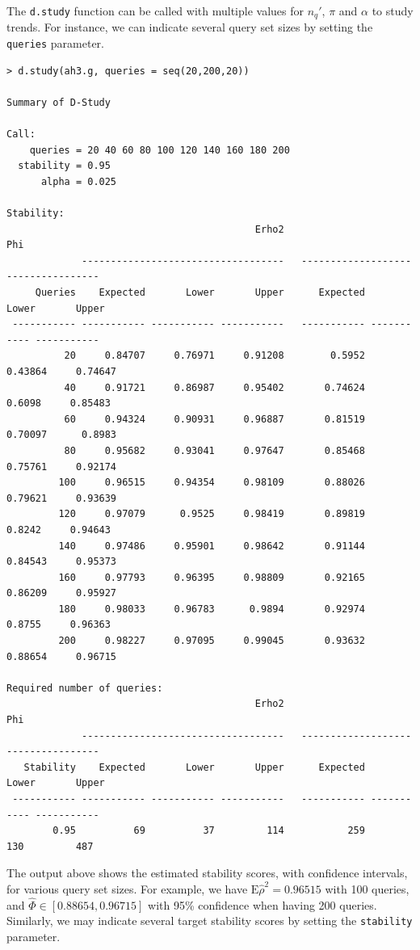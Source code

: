 \documentclass[twoside]{article}
\begin{document}
The \texttt{d.study} function can be called with multiple values for $n_q'$, $\pi$ and $\alpha$ to study trends. For instance, we can indicate several query set sizes by setting the \texttt{queries} parameter.

{\small\begin{verbatim}
> d.study(ah3.g, queries = seq(20,200,20))

Summary of D-Study

Call:
    queries = 20 40 60 80 100 120 140 160 180 200 
  stability = 0.95 
      alpha = 0.025 

Stability:
                                           Erho2                                   Phi
             -----------------------------------   -----------------------------------
     Queries    Expected       Lower       Upper      Expected       Lower       Upper
 ----------- ----------- ----------- -----------   ----------- ----------- -----------
          20     0.84707     0.76971     0.91208        0.5952     0.43864     0.74647 
          40     0.91721     0.86987     0.95402       0.74624      0.6098     0.85483 
          60     0.94324     0.90931     0.96887       0.81519     0.70097      0.8983 
          80     0.95682     0.93041     0.97647       0.85468     0.75761     0.92174 
         100     0.96515     0.94354     0.98109       0.88026     0.79621     0.93639 
         120     0.97079      0.9525     0.98419       0.89819      0.8242     0.94643 
         140     0.97486     0.95901     0.98642       0.91144     0.84543     0.95373 
         160     0.97793     0.96395     0.98809       0.92165     0.86209     0.95927 
         180     0.98033     0.96783      0.9894       0.92974      0.8755     0.96363 
         200     0.98227     0.97095     0.99045       0.93632     0.88654     0.96715 

Required number of queries:
                                           Erho2                                   Phi
             -----------------------------------   -----------------------------------
   Stability    Expected       Lower       Upper      Expected       Lower       Upper
 ----------- ----------- ----------- -----------   ----------- ----------- -----------
        0.95          69          37         114           259         130         487
\end{verbatim}}

The output above shows the estimated stability scores, with confidence intervals, for various query set sizes. For example, we have $\text{E}\hat\rho^2=0.96515$ with 100 queries, and $\hat\Phi\in[0.88654, 0.96715]$ with 95\% confidence when having 200 queries.
Similarly, we may indicate several target stability scores by setting the \texttt{stability} parameter.
\end{document}
